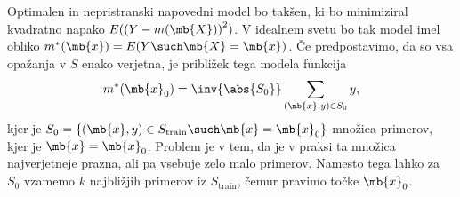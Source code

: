 Optimalen in nepristranski napovedni model bo takšen, ki bo minimiziral
kvadratno napako $E({(Y - m(\mb{X}))}^2)$.
V idealnem svetu bo tak model imel obliko $m^*(\mb{x}) = E(Y \such \mb{X} =
\mb{x})$.
Če predpostavimo, da so vsa opažanja v $S$ enako verjetna, je približek tega
modela funkcija
\[
  m^*(\mb{x}_0) = \inv{\abs{S_0}} \sum_{(\mb{x}, y) \in S_0} y,
\]
kjer je $S_0 = \{(\mb{x}, y) \in S_{\text{train}} \such \mb{x} = \mb{x}_0\}$
množica primerov, kjer je $\mb{x} = \mb{x}_0$.
Problem je v tem, da je v praksi ta množica najverjetneje prazna, ali pa vsebuje
zelo malo primerov.
Namesto tega lahko za $S_0$ vzamemo $k$ najbližjih primerov iz
$S_{\text{train}}$, čemur pravimo  točke $\mb{x}_0$.

